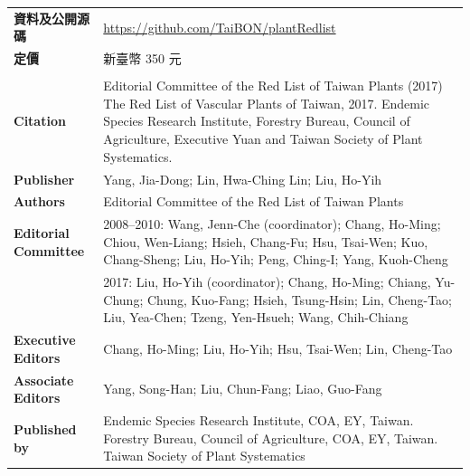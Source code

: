 \begin{table}[H]
{\begin{tabular}{>{\raggedright\arraybackslash}p{3cm}p{8cm}}
      \textbf{資料及公開源碼}    & \href{https://github.com/TaiBON/plantRedlist}{https://github.com/TaiBON/plantRedlist} \\
      \textbf{定價}              & 新臺幣 350 元 \\
       & \\
      \textbf{Citation}          & Editorial Committee of the Red List of Taiwan Plants (2017) The Red List of Vascular Plants of Taiwan, 2017.
                                   Endemic Species Research Institute, Forestry Bureau, Council of Agriculture, 
                                   Executive Yuan and Taiwan Society of Plant Systematics. \\
      \textbf{Publisher}         & Yang, Jia-Dong; Lin, Hwa-Ching Lin; Liu, Ho-Yih \\
      \textbf{Authors}           & Editorial Committee of the Red List of Taiwan Plants \\
      \textbf{Editorial Committee} & 2008--2010: Wang, Jenn-Che (coordinator);
                                     Chang, Ho-Ming;
                                     Chiou, Wen-Liang;
                                     Hsieh, Chang-Fu;
                                     Hsu, Tsai-Wen;
                                     Kuo, Chang-Sheng;
                                     Liu, Ho-Yih;
                                     Peng, Ching-I;
                                     Yang, Kuoh-Cheng \\
                                   &  2017: Liu, Ho-Yih (coordinator);
                                     Chang, Ho-Ming;
                                     Chiang, Yu-Chung;
                                     Chung, Kuo-Fang;
                                     Hsieh, Tsung-Hsin; 
                                     Lin, Cheng-Tao;
                                     Liu, Yea-Chen;
                                     Tzeng, Yen-Hsueh; 
                                     Wang, Chih-Chiang \\
      \textbf{Executive Editors}  & Chang, Ho-Ming; Liu, Ho-Yih; Hsu, Tsai-Wen; Lin, Cheng-Tao \\
      \textbf{Associate Editors}  & Yang, Song-Han; Liu, Chun-Fang; Liao, Guo-Fang \\
      \textbf{Published by}       & Endemic Species Research Institute, COA, EY, Taiwan.
                                    Forestry Bureau, Council of Agriculture, COA, EY, Taiwan.
                                    Taiwan Society of Plant Systematics \\

\end{tabular}}
\end{table}
